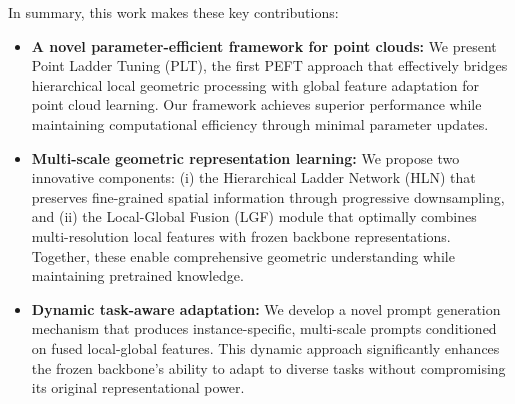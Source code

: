 
In summary, this work makes these key contributions:
\begin{itemize}
	\item \textbf{A novel parameter-efficient framework for point clouds:} We present Point Ladder Tuning (PLT), the first PEFT approach that effectively bridges hierarchical local geometric processing with global feature adaptation for point cloud learning. Our framework achieves superior performance while maintaining computational efficiency through minimal parameter updates.
	
	\item \textbf{Multi-scale geometric representation learning:} We propose two innovative components: (i) the Hierarchical Ladder Network (HLN) that preserves fine-grained spatial information through progressive downsampling, and (ii) the Local-Global Fusion (LGF) module that optimally combines multi-resolution local features with frozen backbone representations. Together, these enable comprehensive geometric understanding while maintaining pretrained knowledge.
	
	\item \textbf{Dynamic task-aware adaptation:} We develop a novel prompt generation mechanism that produces instance-specific, multi-scale prompts conditioned on fused local-global features. This dynamic approach significantly enhances the frozen backbone's ability to adapt to diverse tasks without compromising its original representational power.
\end{itemize}



